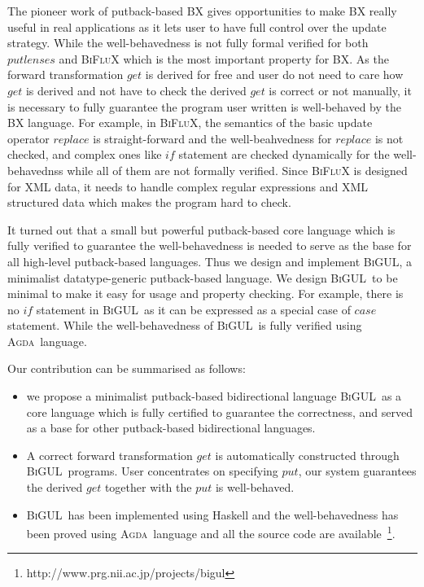 \documentclass[fleqn]{llncs}
\newcommand{\BiGUL}{\textsc{BiGUL}}
\newcommand{\Agda}{\textsc{Agda}}
\begin{document}
The pioneer work of putback-based BX gives opportunities to make BX really useful in real applications
as it lets user to have full control over the update strategy.
While the well-behavedness is not fully formal verified for both $putlenses$ and \textsc{BiFluX} which is the most important property for {BX}.
As the forward transformation $get$ is derived for free
and user 
do not need to care how $get$ is derived 
and not have to check the derived $get$ is correct or not manually, 
it is necessary to fully guarantee the program user written is well-behaved by the BX language.
%
For example, in \textsc{BiFluX},
the semantics of the basic update operator $replace$ is straight-forward 
and the well-beahvedness for $replace$ is not checked, 
and complex ones like $if$ statement are checked dynamically for the well-behavednss 
while all of them are not formally verified.
Since \textsc{BiFluX} is designed for XML data,
it needs to handle complex regular expressions 
and XML structured data which makes the program hard to check.

It turned out that a small but powerful putback-based core language 
which is fully verified to guarantee the well-behavedness is needed 
to serve as the base for all high-level putback-based languages.
Thus we design and implement \BiGUL, a minimalist datatype-generic putback-based language.
We design \BiGUL\ to be minimal to make it easy for usage and property checking. 
For example, there is no $if$ statement in \BiGUL\ as it can be expressed as a special case of $case$ statement.
While the well-behavedness of \BiGUL\ is fully verified using \Agda\ language.

Our contribution can be summarised as follows:
\begin{itemize}[leftmargin=0.3in]
  \item we propose a minimalist putback-based bidirectional language \BiGUL\ as a core language which is fully certified to guarantee the correctness, and served as a base for other putback-based bidirectional languages.
  \item A correct forward transformation $get$ is automatically constructed through \BiGUL\ programs. User concentrates on specifying $put$, our system guarantees the derived $get$ together with the $put$ is well-behaved.
  \item \BiGUL\ has been implemented using Haskell and the well-behavedness has been proved using \Agda\ language and all the source code are available~\footnote{http://www.prg.nii.ac.jp/projects/bigul}.
\end{itemize}
\end{document}

